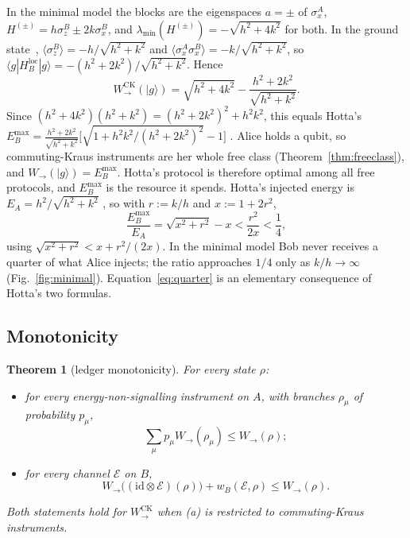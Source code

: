 \documentclass[aps,pra,twocolumn,reprint,superscriptaddress,nofootinbib,floatfix]{revtex4-2}
\theoremstyle{plain}
\newtheorem{theorem}{Theorem}
\theoremstyle{remark}
\newcommand{\id}{\mathrm{id}}
\newcommand{\Wto}{W_{\to}}
\newcommand{\WCK}{W_{\to}^{\mathrm{CK}}}
\newcommand{\HBl}{H_B^{\mathrm{loc}}}
\newcommand{\E}{\mathcal{E}}
\newcommand{\lmin}{\lambda_{\min}}
\newcommand{\ket}[1]{|#1\rangle}
\newcommand{\bra}[1]{\langle #1|}
\begin{document}
In the minimal model the blocks are the eigenspaces $a=\pm$ of $\sigma_x^A$,
$H^{(\pm)}=h\sigma_z^B\pm2k\sigma_x^B$, and $\lmin(H^{(\pm)})=-\sqrt{h^2+4k^2}$ for both.
In the ground state~\cite[Sec.~3]{Hotta2011review}, $\langle\sigma_z^B\rangle=-h/\sqrt{h^2+k^2}$
and $\langle\sigma_x^A\sigma_x^B\rangle=-k/\sqrt{h^2+k^2}$, so
$\bra{g}\HBl\ket{g}=-(h^2+2k^2)/\sqrt{h^2+k^2}$. Hence
\begin{equation}
\WCK(\ket{g})=\sqrt{h^2+4k^2}-\frac{h^2+2k^2}{\sqrt{h^2+k^2}} .
\label{eq:EBmax}
\end{equation}
Since $(h^2+4k^2)(h^2+k^2)=(h^2+2k^2)^2+h^2k^2$, this equals Hotta's
$E_B^{\max}=\frac{h^2+2k^2}{\sqrt{h^2+k^2}}\big[\sqrt{1+h^2k^2/(h^2+2k^2)^2}-1\big]$
\cite[Eq.~(11)]{Hotta2011review}. Alice holds a qubit, so commuting-Kraus instruments are her
whole free class (Theorem~\ref{thm:freeclass}), and $\Wto(\ket g)=E_B^{\max}$. Hotta's
protocol is therefore optimal among all free protocols, and $E_B^{\max}$ is the resource it
spends. Hotta's injected energy is $E_A=h^2/\sqrt{h^2+k^2}$ \cite[Eq.~(8)]{Hotta2011review},
so with $r:=k/h$ and $x:=1+2r^2$,
\begin{equation}
\frac{E_B^{\max}}{E_A}=\sqrt{x^2+r^2}-x<\frac{r^2}{2x}<\frac14 ,
\label{eq:quarter}
\end{equation}
using $\sqrt{x^2+r^2}<x+r^2/(2x)$. In the minimal model Bob never receives a quarter of what
Alice injects; the ratio approaches $1/4$ only as $k/h\to\infty$ (Fig.~\ref{fig:minimal}).
Equation~\eqref{eq:quarter} is an elementary consequence of Hotta's two formulas.

\subsection{Monotonicity}

\begin{theorem}[ledger monotonicity]
\label{thm:ledger}
For every state $\rho$:
\begin{itemize}
\item[(a)] for every energy-non-signalling instrument on $A$, with branches $\rho_\mu$ of
probability $p_\mu$,
\begin{equation}
\sum_\mu p_\mu\Wto(\rho_\mu)\le\Wto(\rho);
\label{eq:mono-a}
\end{equation}
\item[(b)] for every channel $\E$ on $B$,
\begin{equation}
\Wto\big((\id\otimes\E)(\rho)\big)+w_B(\E,\rho)\le\Wto(\rho).
\label{eq:mono-b}
\end{equation}
\end{itemize}
Both statements hold for $\WCK$ when (a) is restricted to commuting-Kraus instruments.
\end{theorem}
\end{document}

